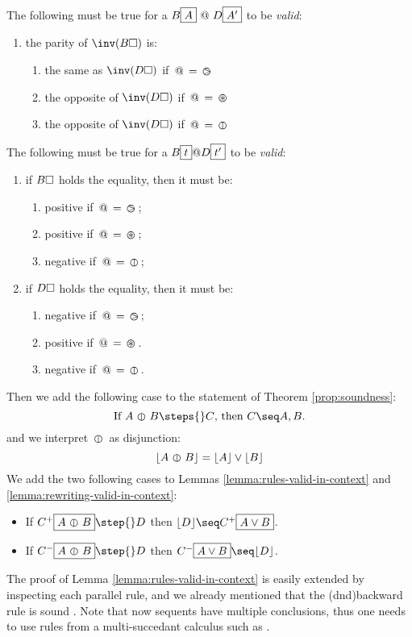 \begin{condition}\label{cond:pol-classical}
  
  The following must be true for a  $B\fbox{$A$}\operatorname{\,@\,}
  D\fbox{$A'$}$ to be \emph{ valid}:
  \begin{enumerate}
    \item the parity of $\inv(B\hole)$ is:
      \begin{enumerate}
        \item the same as $\inv(D\hole)$ if $\operatorname{\,@\,} = \operatorname{\,\varogreaterthan\,}$
        \item the opposite of $\inv(D\hole)$ if $\operatorname{\,@\,} = \operatorname{\,\varoast\,}$
        \item the opposite of $\inv(D\hole)$ if $\operatorname{\,@\,} = \operatorname{\,\varobar\,}$
      \end{enumerate}\label{clause:opposite}
  \end{enumerate}

  The following must be true for a  $B\fbox{$t$} @ D\fbox{$t'$}$
  to be \emph{ valid}:
  \begin{enumerate}
    \item if $B\square$ holds the equality, then it must be:
      \begin{enumerate}
        \item positive if $\operatorname{\,@\,} = \operatorname{\,\varogreaterthan\,}$;
        \item positive if $\operatorname{\,@\,} = \operatorname{\,\varoast\,}$;
        \item negative if $\operatorname{\,@\,} = \operatorname{\,\varobar\,}$;
      \end{enumerate}
    \item if $D\square$ holds the equality, then it must be:
      \begin{enumerate} 
        \item negative if $\operatorname{\,@\,} = \operatorname{\,\varogreaterthan\,}$;
        \item positive if $\operatorname{\,@\,} = \operatorname{\,\varoast\,}$.
        \item negative if $\operatorname{\,@\,} = \operatorname{\,\varobar\,}$.
      \end{enumerate}
  \end{enumerate}
\end{condition}

Then we add the following case to the statement of Theorem \ref{prop:soundness}:
  $$\text{If $A \para B \steps{} C$, then $C \seq A, B$.}$$
and we interpret $\operatorname{\,\varobar\,}$ as disjunction:
  $$\lfloor A \operatorname{\,\varobar\,} B\rfloor = \lfloor A\rfloor \lor \lfloor B\rfloor$$
We add the two following cases to Lemmas \ref{lemma:rules-valid-in-context} and
\ref{lemma:rewriting-valid-in-context}:
\begin{itemize}
  \item If $C^+\select{A\para B}\step{} D$ then $\lint{D} \seq C^+\select{A\lor B}$.
  \item If $C^-\select{A\para B}\step{} D$ then $C^-\select{A\lor B}\seq \lint{D}$.
\end{itemize}
The proof of Lemma \ref{lemma:rules-valid-in-context} is easily extended by
inspecting each parallel rule, and we already mentioned that the \kl(dnd){backward} rule
{} is sound . Note that now sequents have multiple
conclusions, thus one needs to use rules from a multi-succedant calculus such as
 \cite{negri_structural_2001}.

